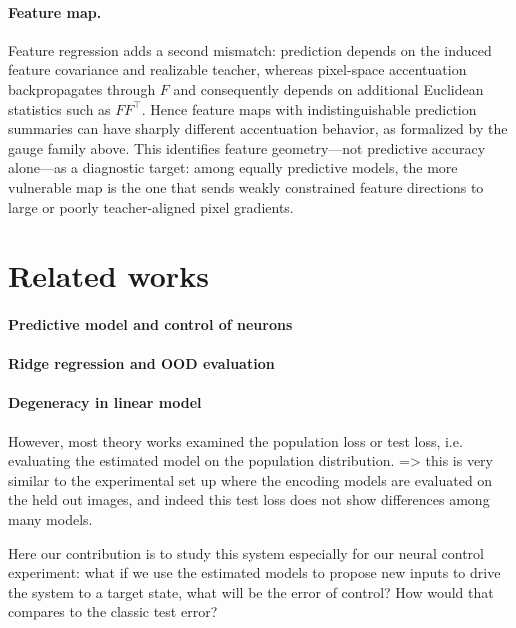 \documentclass{article}
\theoremstyle{plain}
\theoremstyle{definition}
\theoremstyle{remark}
\begin{document}
\paragraph{Feature map.}
Feature regression adds a second mismatch: prediction depends on the induced feature covariance and realizable teacher, whereas pixel-space accentuation backpropagates through $F$ and consequently depends on additional Euclidean statistics such as $FF^\top$.
Hence feature maps with indistinguishable prediction summaries can have sharply different accentuation behavior, as formalized by the gauge family above.
This identifies feature geometry---not predictive accuracy alone---as a diagnostic target: among equally predictive models, the more vulnerable map is the one that sends weakly constrained feature directions to large or poorly teacher-aligned pixel gradients.





\section{Related works}
\paragraph{Predictive model and control of neurons}


\paragraph{Ridge regression and OOD evaluation}


\paragraph{Degeneracy in linear model}




\clearpage




\iffalse

However, most theory works examined the population loss or test loss, i.e. evaluating the estimated model on the population distribution. => this is very similar to the experimental set up where the encoding models are evaluated on the held out images, and indeed this test loss does not show differences among many models.

Here our contribution is to study this system especially for our neural control experiment: what if we use the estimated models to propose new inputs to drive the system to a target state, what will be the error of control? How would that compares to the classic test error?
\end{document}
